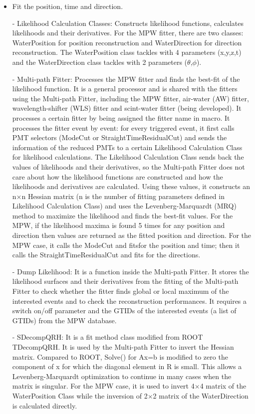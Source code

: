 \begin{itemize}
	\item Fit the position, time and direction.
	
	- Likelihood Calculation Classes: Constructs likelihood functions, calculates likelihoods and their derivatives. For the MPW fitter, there are two classes: WaterPosition for position reconstruction and WaterDirection for direction reconstruction. The WaterPosition class tackles with 4 parameters (x,y,z,t) and the WaterDirection class tackles with 2 parameters ($\theta$,$\phi$). 
	
	- Multi-path Fitter: Processes the MPW fitter and finds the best-fit of the likelihood function. It is a general processor and is shared with the fitters using the Multi-path Fitter, including the MPW fitter, air-water (AW) fitter, wavelength-shifter (WLS) fitter and scint-water fitter (being developed). It processes a certain fitter by being assigned the fitter name in macro. It processes the fitter event by event: for every triggered event, it first calls PMT selectors (ModeCut or StraightTimeResidualCut) and sends the information of the reduced PMTs to a certain Likelihood Calculation Class for likelihood calculations. The Likelihood Calculation Class sends back the values of likelihoods and their derivatives, so the Multi-path Fitter does not care about how the likelihood functions are constructed and how the likelihoods and derivatives are calculated. Using these values, it constructs an n$\times$n Hessian matrix (n is the number of fitting parameters defined in Likelihood Calculation Class) and uses the Levenberg-Marquardt (MRQ) method to maximize the likelihood and finds the best-fit values. For the MPW, if the likelihood maxima is found 5 times for any position and direction then values are returned as the fitted position and direction. For the MPW case, it calls the ModeCut and fitsfor the position and time; then it calls the StraightTimeResidualCut and fits for the directions.
	
	- Dump Likelihood: It is a function inside the Multi-path Fitter. It stores the likelihood surfaces and their derivatives from the fitting of the Multi-path Fitter to check whether the fitter finds global or local maximum of the interested events and to check the reconstruction performances. It requires a switch on/off parameter and the GTIDs of the interested events (a list of GTIDs) from the MPW database.
	
	- SDecompQRH: It is a fit method class modified from ROOT TDecompQRH. It is used by the Multi-path Fitter to invert the Hessian matrix. Compared to ROOT, Solve() for Ax=b is modified to zero the component of x for which the diagonal element in R is small. This allows a Levenberg-Marquardt optimization to continue in many cases
	when the matrix is singular. For the MPW case, it is used to invert 4$\times$4 matrix of the WaterPosition Class while the inversion of 2$\times$2 matrix of the WaterDirection is calculated directly.
	

\end{itemize}
